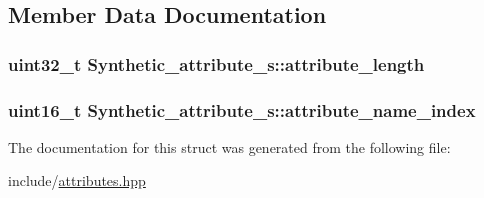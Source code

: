 \subsection{Member Data Documentation}
\hypertarget{structSynthetic__attribute__s_a3c8e6a2024b6646ced85a7414040b6f6}{
\subsubsection[{attribute\+\_\+length}]{\setlength{\rightskip}{0pt plus 5cm}uint32\+\_\+t Synthetic\+\_\+attribute\+\_\+s\+::attribute\+\_\+length}}\label{structSynthetic__attribute__s_a3c8e6a2024b6646ced85a7414040b6f6}
\hypertarget{structSynthetic__attribute__s_a40701978ef09290bcaa9793503312706}{
\subsubsection[{attribute\+\_\+name\+\_\+index}]{\setlength{\rightskip}{0pt plus 5cm}uint16\+\_\+t Synthetic\+\_\+attribute\+\_\+s\+::attribute\+\_\+name\+\_\+index}}\label{structSynthetic__attribute__s_a40701978ef09290bcaa9793503312706}


The documentation for this struct was generated from the following file\+:\begin{DoxyCompactItemize}
\item 
include/\hyperlink{attributes_8hpp}{attributes.\+hpp}\end{DoxyCompactItemize}
